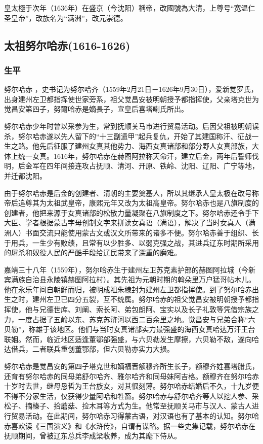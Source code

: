 皇太極于次年（1636年）在盛京（今沈阳）稱帝，改國號為大清，上尊号“宽温仁圣皇帝”，改族名为“满洲”，改元崇德。

\subsection{太祖努尔哈赤\tiny(1616-1626)}

\subsubsection{生平}

努尔哈赤 ，史书记为努尔哈齐（1559年2月21日－1626年9月30日），爱新觉罗氏，出身建州左卫都指挥使世家旁系，祖父觉昌安被明朝授予都指挥使，父亲塔克世为觉昌安第四子，努爾哈赤是嫡長子，宣皇后喜塔喇氏所出。

努尔哈赤少年时曾以采参为生，常到抚顺关马市进行贸易活动。后因父祖被明朝误杀，努尔哈赤遂以先人留下的“十三副遗甲”起兵复仇，开始了其建国称汗、征战一生之路。他先后征服了建州女真其他势力、海西女真诸部和部分野人女真部族，大体上统一女真。1616年，努尔哈赤在赫图阿拉称天命汗，建立后金，两年后誓师伐明，后金军在四年间接连攻占抚顺、清河、开原、铁岭、沈阳、辽阳、广宁等地，并迁都沈阳。

由于努尔哈赤是后金的创建者、清朝的主要奠基人，所以其继承人皇太极在改号称帝后追尊其为太祖武皇帝，康熙元年又改为太祖高皇帝。努尔哈赤也是八旗制度的创建者，他把来源于女真诸部的松散力量凝聚在八旗制度之下。努尔哈赤还令手下大臣、学者根据蒙古字母创制文字来拼读女真语（满语），解决了当时女真人（满洲人）书面交流只能使用蒙古文或汉文所带来的诸多不便。努尔哈赤善于组织、长于用兵，一生少有败绩，且常有以少胜多、以弱克强之战，其进兵辽东时期所采用的屠杀和奴役人民的严酷手段给辽民带来了深重的磨难。

嘉靖三十八年（1559年），努尔哈赤生于建州左卫苏克素护部的赫图阿拉城（今新宾满族自治县永陵镇赫图阿拉村）。其先祖为元朝时期的斡朵里万户猛哥帖木儿。他在永乐年间自朝鲜而归，被明成祖朱棣封为建州左卫都指挥使。到了努尔哈赤出生之时，建州左卫已四分五裂，互不统属。努尔哈赤的祖父觉昌安被明朝授予都指挥使，他与兄德世库、刘阐、索长阿、弟包朗阿、宝实以及长子礼敦等凭借宗族之力，一度占据了五岭以东、苏克苏浒河以西二百余里之地。觉昌安与兄弟合称“六贝勒”，称雄于该地区。他们与当时女真诸部实力最强盛的海西女真哈达万汗王台联姻。然而，临近地区适逢董鄂部强盛，与六贝勒发生摩擦，六贝勒不敌，遂向哈达借兵，二者联兵重创董鄂部，但六贝勒亦实力大损。

努尔哈赤是觉昌安的第四子塔克世和嫡福晋额穆齐所生长子，额穆齐姓喜塔腊氏，还育有努尔哈赤的同母弟舒尔哈齐、雅尔哈齐和同母妹阿吉格。额穆齐在努尔哈赤十岁时去世，继母恳哲为王台族女，对其很刻薄。努尔哈赤结婚后不久，十九岁便不得不分家生活，仅获得少量阿哈和牲畜。努尔哈赤与舒尔哈齐等人以挖人参、采松子、摘榛子、拾蘑菇、捡木耳等方式为生。他常至抚顺关马市与汉人、蒙古人进行贸易活动。在此期间，努尔哈赤习得蒙古语，对汉语也有了基本的认知。努尔哈赤喜欢读《三国演义》和《水浒传》，自谓有谋略。据一些史集记载，努尔哈赤在抚顺期间，曾被辽东总兵李成梁收养，成为其麾下侍从。

